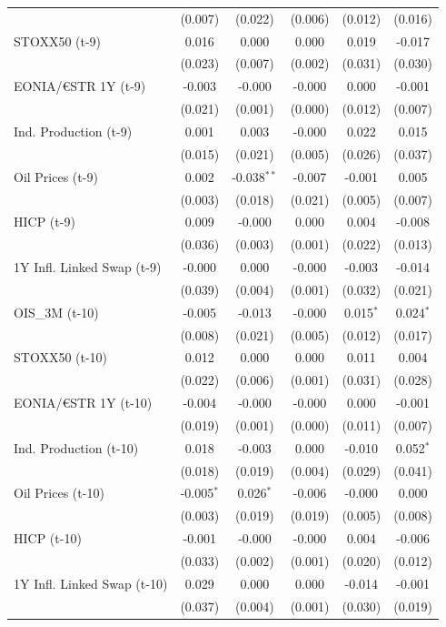 \begin{longtable}[t]{lccccc}
 & (0.007) & (0.022) & (0.006) & (0.012) & (0.016)\\
STOXX50 (t-9) & 0.016 & 0.000 & 0.000 & 0.019 & -0.017\\
 & (0.023) & (0.007) & (0.002) & (0.031) & (0.030)\\
EONIA/€STR 1Y (t-9) & -0.003 & -0.000 & -0.000 & 0.000 & -0.001\\
 & (0.021) & (0.001) & (0.000) & (0.012) & (0.007)\\
Ind. Production (t-9) & 0.001 & 0.003 & -0.000 & 0.022 & 0.015\\
 & (0.015) & (0.021) & (0.005) & (0.026) & (0.037)\\
Oil Prices (t-9) & 0.002 & -0.038$^{**}$ & -0.007 & -0.001 & 0.005\\
 & (0.003) & (0.018) & (0.021) & (0.005) & (0.007)\\
HICP (t-9) & 0.009 & -0.000 & 0.000 & 0.004 & -0.008\\
 & (0.036) & (0.003) & (0.001) & (0.022) & (0.013)\\
1Y Infl. Linked Swap (t-9) & -0.000 & 0.000 & -0.000 & -0.003 & -0.014\\
 & (0.039) & (0.004) & (0.001) & (0.032) & (0.021)\\
OIS\_3M (t-10) & -0.005 & -0.013 & -0.000 & 0.015$^{*}$ & 0.024$^{*}$\\
 & (0.008) & (0.021) & (0.005) & (0.012) & (0.017)\\
STOXX50 (t-10) & 0.012 & 0.000 & 0.000 & 0.011 & 0.004\\
 & (0.022) & (0.006) & (0.001) & (0.031) & (0.028)\\
EONIA/€STR 1Y (t-10) & -0.004 & -0.000 & -0.000 & 0.000 & -0.001\\
 & (0.019) & (0.001) & (0.000) & (0.011) & (0.007)\\
Ind. Production (t-10) & 0.018 & -0.003 & 0.000 & -0.010 & 0.052$^{*}$\\
 & (0.018) & (0.019) & (0.004) & (0.029) & (0.041)\\
Oil Prices (t-10) & -0.005$^{*}$ & 0.026$^{*}$ & -0.006 & -0.000 & 0.000\\
 & (0.003) & (0.019) & (0.019) & (0.005) & (0.008)\\
HICP (t-10) & -0.001 & -0.000 & -0.000 & 0.004 & -0.006\\
 & (0.033) & (0.002) & (0.001) & (0.020) & (0.012)\\
1Y Infl. Linked Swap (t-10) & 0.029 & 0.000 & 0.000 & -0.014 & -0.001\\
 & (0.037) & (0.004) & (0.001) & (0.030) & (0.019)\\

\end{longtable}
